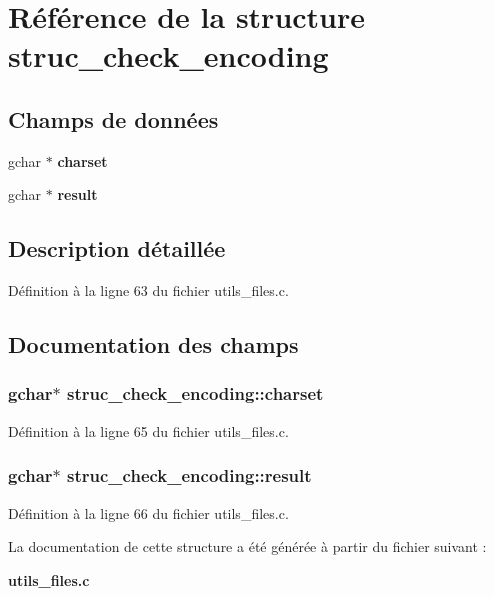 \section{Référence de la structure struc\_\-check\_\-encoding}
\label{structstruc__check__encoding}
\subsection*{Champs de données}
\begin{DoxyCompactItemize}
\item 
gchar $\ast$ {\bf charset}
\item 
gchar $\ast$ {\bf result}
\end{DoxyCompactItemize}


\subsection{Description détaillée}


Définition à la ligne 63 du fichier utils\_\-files.c.



\subsection{Documentation des champs}
\subsubsection[{charset}]{\setlength{\rightskip}{0pt plus 5cm}gchar$\ast$ {\bf struc\_\-check\_\-encoding::charset}}\label{structstruc__check__encoding_abf4e33e49a7710dc12e1355fd6e51046}


Définition à la ligne 65 du fichier utils\_\-files.c.

\subsubsection[{result}]{\setlength{\rightskip}{0pt plus 5cm}gchar$\ast$ {\bf struc\_\-check\_\-encoding::result}}\label{structstruc__check__encoding_a5d37cd5d2840616f79053df2dd1ab72d}


Définition à la ligne 66 du fichier utils\_\-files.c.



La documentation de cette structure a été générée à partir du fichier suivant :\begin{DoxyCompactItemize}
\item 
{\bf utils\_\-files.c}\end{DoxyCompactItemize}
